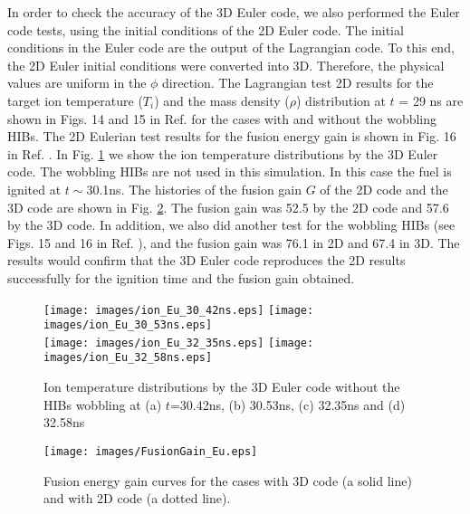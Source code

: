 In order to check the accuracy of the 3D Euler code, we also performed the Euler code tests, using the initial conditions of the 2D Euler code. The initial conditions in the Euler code are the output of the Lagrangian code.  To this end, the 2D Euler initial conditions were converted into 3D. Therefore, the physical values are uniform in the $\phi$ direction. The Lagrangian test 2D results for the target ion temperature ($T_i$) and the mass density ($\rho$) distribution at $t$ = 29 ns are shown in Figs. 14 and 15 in Ref. \cite{CPC-O-SUKI} for the cases with and without the wobbling HIBs.  The 2D Eulerian test results for the fusion energy gain is shown in Fig. 16 in Ref. \cite{CPC-O-SUKI}.  In Fig. \ref{Ti_Eu_3d} we show the ion temperature distributions by the 3D Euler code. The wobbling HIBs are not used in this simulation. In this case the fuel is ignited at $t \sim $30.1ns. The histories of the fusion gain $G$ of the 2D code and the 3D code are shown in Fig. \ref{FusionGain_Eu}. The fusion gain was 52.5 by the 2D code and 57.6 by the 3D code. In addition, we also did another test for the wobbling HIBs (see Figs. 15 and 16 in Ref. \cite{CPC-O-SUKI}), and the fusion gain was 76.1 in 2D \cite{CPC-O-SUKI} and 67.4 in 3D. The results would confirm that the 3D Euler code reproduces the 2D results successfully for the ignition time and the fusion gain obtained. 


\begin{figure}[H]
		\centering
		\texttt{[image: images/ion\_Eu\_30\_42ns.eps]}
		\texttt{[image: images/ion\_Eu\_30\_53ns.eps]} \\
		\texttt{[image: images/ion\_Eu\_32\_35ns.eps]}
		\texttt{[image: images/ion\_Eu\_32\_58ns.eps]} \\
		\caption{Ion temperature distributions by the 3D Euler code without the HIBs wobbling at (a) $t$=30.42ns, (b) 30.53ns, (c) 32.35ns and (d) 32.58ns}\label{Ti_Eu_3d}
\end{figure}


\begin{figure}[H]
		\centering
		\texttt{[image: images/FusionGain\_Eu.eps]}
		\caption{Fusion energy gain curves for the cases with 3D code (a solid line) and with 2D code (a dotted line).}\label{FusionGain_Eu}
\end{figure}

